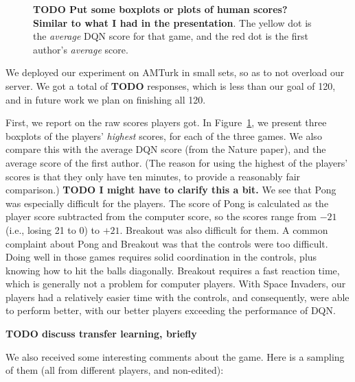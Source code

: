 \documentclass[letterpaper, 10 pt, conference]{ieeeconf}  %
\begin{document}
\begin{figure}[t]
\begin{center}
\fbox{\rule[-.5cm]{0cm}{4cm} \rule[-.5cm]{4cm}{0cm}}
\end{center}
\caption{\textbf{TODO Put some boxplots or plots of human scores? Similar to what I had in the
presentation}. The yellow dot is the \emph{average} DQN score for that game, and the red dot is the
first author's \emph{average} score.}
\label{fig:human_results}
\end{figure}

We deployed our experiment on AMTurk in small sets, so as to not overload our server. We got a total
of \textbf{TODO} responses, which is less than our goal of 120, and in future work we plan on
finishing all 120.

First, we report on the raw scores players got. In Figure~\ref{fig:human_results}, we present three
boxplots of the players' \emph{highest} scores, for each of the three games. We also compare this
with the average DQN score (from the Nature paper), and the average score of the first author. (The
reason for using the highest of the players' scores is that they only have ten minutes, to provide a
reasonably fair comparison.) \textbf{TODO I might have to clarify this a bit.} We see that Pong was
especially difficult for the players. The score of Pong is calculated as the player score subtracted
from the computer score, so the scores range from $-21$ (i.e., losing 21 to 0) to $+21$. Breakout
was also difficult for them. A common complaint about Pong and Breakout was that the controls were
too difficult. Doing well in those games requires solid coordination in the controls, plus knowing
how to hit the balls diagonally. Breakout requires a fast reaction time, which is generally not a
problem for computer players. With Space Invaders, our players had a relatively easier time with the
controls, and consequently, were able to perform better, with our better players exceeding the
performance of DQN.

\textbf{TODO discuss transfer learning, briefly}

We also received some interesting comments about the game. Here is a sampling of them (all from
different players, and non-edited):
\end{document}
